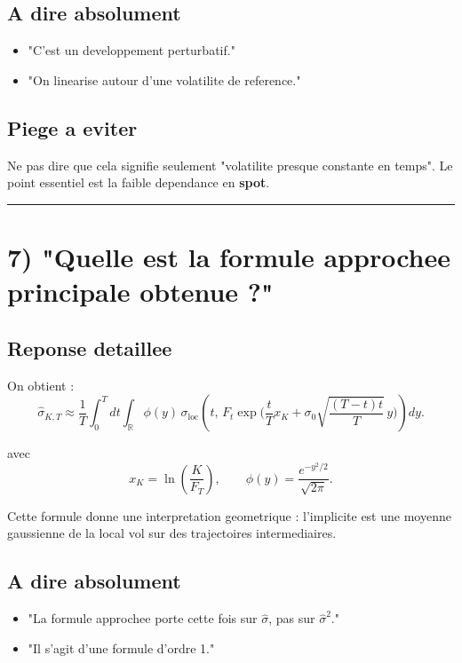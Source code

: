 \documentclass[11pt,a4paper]{article}
\begin{document}
\subsection{A dire absolument}

\begin{itemize}
\item "C'est un developpement perturbatif."
\item "On linearise autour d'une volatilite de reference."
\end{itemize}

\subsection{Piege a eviter}

Ne pas dire que cela signifie seulement "volatilite presque constante en temps".  
Le point essentiel est la faible dependance en \textbf{spot}.

\bigskip\hrule\bigskip

\section{7) "Quelle est la formule approchee principale obtenue ?"}

\subsection{Reponse detaillee}

On obtient :
\[
\hat{\sigma}_{K,T}
\approx
\frac{1}{T}
\int_0^T\!\!dt
\int_{\mathbb R}\phi(y)\,
\sigma_{\mathrm{loc}}\!\left(
t,\,
F_t\exp\!\Big(
\frac{t}{T}x_K+\sigma_0\sqrt{\frac{(T-t)t}{T}}\,y
\Big)
\right)dy.
\]

avec
\[
x_K=\ln\!\left(\frac{K}{F_T}\right),
\qquad
\phi(y)=\frac{e^{-y^2/2}}{\sqrt{2\pi}}.
\]

Cette formule donne une interpretation geometrique : l'implicite est une moyenne gaussienne de la local vol sur des trajectoires intermediaires.

\subsection{A dire absolument}

\begin{itemize}
\item "La formule approchee porte cette fois sur \(\hat{\sigma}\), pas sur \(\hat{\sigma}^2\)."
\item "Il s'agit d'une formule d'ordre 1."
\end{itemize}
\end{document}
